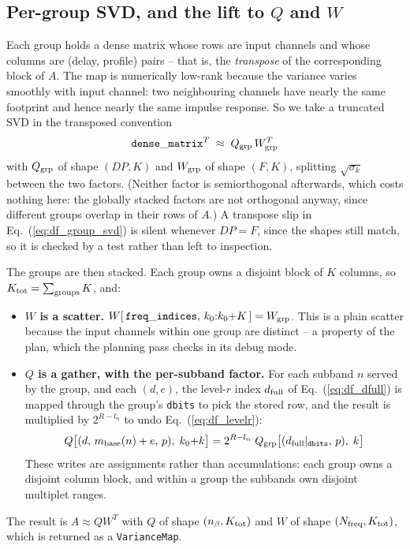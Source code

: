 \documentclass{article}
\numberwithin{equation}{section}   %
\begin{document}
\subsection{Per-group SVD, and the lift to $Q$ and $W$}
\label{ssec:df_lift}

Each group holds a dense matrix whose rows are input channels and whose columns are
(delay, profile) pairs -- that is, the {\em transpose} of the corresponding block of $A$. The map
is numerically low-rank because the variance varies smoothly with input channel: two neighbouring
channels have nearly the same footprint and hence nearly the same impulse response. So we take a
truncated SVD in the transposed convention
\begin{equation}
{\tt dense\_matrix}^T \; \approx \; Q_{\rm grp} \, W_{\rm grp}^T
  \label{eq:df_group_svd}
\end{equation}
with $Q_{\rm grp}$ of shape $(DP, K)$ and $W_{\rm grp}$ of shape $(F, K)$, splitting
$\sqrt{\sigma_k}$ between the two factors. (Neither factor is semiorthogonal afterwards, which
costs nothing here: the globally stacked factors are not orthogonal anyway, since different
groups overlap in their rows of $A$.) A transpose slip in Eq.\ (\ref{eq:df_group_svd}) is silent
whenever $DP = F$, since the shapes still match, so it is checked by a test rather than left to
inspection.

The groups are then stacked. Each group owns a disjoint block of $K$ columns, so
$K_{\rm tot} = \sum_{\rm groups} K$, and:
\begin{itemize}
\item {\bf $W$ is a scatter.} $W[\,{\tt freq\_indices}, \, k_0{:}k_0{+}K\,] = W_{\rm grp}$. This
is a plain scatter because the input channels within one group are distinct -- a property of the
plan, which the planning pass checks in its debug mode.
\item {\bf $Q$ is a gather, with the per-subband factor.} For each subband $n$ served by the
group, and each $(d, e)$, the level-$r$ index $d_{\rm full}$ of Eq.\ (\ref{eq:df_dfull}) is
mapped through the group's {\tt dbits} to pick the stored row, and the result is multiplied by
$2^{R - l_n}$ to undo Eq.\ (\ref{eq:df_levelr}):
\begin{equation}
Q\big[ (d, \, m_{\rm base}(n) + e, \, p), \; k_0{+}k \big]
  = 2^{R-l_n} \; Q_{\rm grp}\big[ (d_{\rm full}|_{\tt dbits}, \, p), \; k \big]
\end{equation}
These writes are assignments rather than accumulations: each group owns a disjoint column block,
and within a group the subbands own disjoint multiplet ranges.
\end{itemize}
The result is $A \approx Q W^T$ with $Q$ of shape $(n_\beta, K_{\rm tot})$ and $W$ of shape
$(N_{\rm freq}, K_{\rm tot})$, which is returned as a \verb|VarianceMap|.
\end{document}
